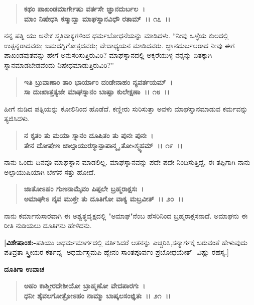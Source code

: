 \begin{verse}
\textbf{ಕಥಂ ಪಾಖಂಡಮಾರ್ಗೇಷು ವರ್ತಸೇ ಜ್ಞಾನದುರ್ಬಲ~।}\\\textbf{ಮಾಂ ನಿಷೇಧಸಿ ಕಸ್ಮಾದ್ವಾ ಮಾಘಸ್ನಾನವಿಧೌ ರತಾಮ್~।। ೧೭~।।}
\end{verse}

ನನ್ನ ಪತ್ನಿ ಯು ಅನೇಕ ಸ್ಮತಿವಾಕ್ಯಗಳಿಂದ ಧರ್ಮಬೋಧನೆಯನ್ನು ಮಾಡಿದಳು. “ನೀವು ಒಳ್ಳೆಯ ಕುಲದಲ್ಲಿ ಉತ್ಪನ್ನರಾದವರು; ಜಮದಗ್ನಿಗೋತ್ರದವರು; ವೇದಾಧ್ಯಯನ ಮಾಡಿದವರು. ಜ್ಞಾನದುರ್ಬಲರಾದ ನೀವು ಈಗ ಪಾಖಂಡವುತವನ್ನು ಹೇಗೆ ಅನುಸರಿಸುತ್ತಿರುವಿರಿ? ಮಾಘಸ್ನಾನದಲ್ಲಿ ಅಕ್ಕರೆಯುಳ್ಳ ನನ್ನನ್ನು ಏತಕ್ಕಾಗಿ ಸ್ನಾನಮಾಡಬೇಡವೆಂದು ನಿಷೇಧಮಾಡುತ್ತಿರುವಿರಿ?”

\begin{verse}
\textbf{ಇತಿ ಬ್ರುವಾಣಾಂ ತಾಂ ಭಾರ್ಯಾಂ ದಂಡೇನಾಹಂ ನ್ಯವರ್ತಯಮ್~।}\\\textbf{ಸಾ ದುಃಖಾತ್ತತ್ಯಜೇ ಮಾಘಸ್ನಾನಂ ಬಾಷ್ಪಾ ಕುಲೇಕ್ಷಣಾ~।। ೧೮~।।}
\end{verse}

ಹೀಗೆ ನುಡಿದ ಪತ್ನಿಯನ್ನು ಕೋಲಿನಿಂದ ಹೊಡೆದೆ. ಕಣ್ಣೀರು ಸುರಿಸುತ್ತಾ ಅವಳು ಮಾಘಸ್ನಾನಮಾಡುವ ಕರ್ಮವನ್ನು ತ್ಯಜಿಸಿದಳು.

\begin{verse}
\textbf{ನ ಕೃತಂ ತು ಮಯಾ ಸ್ನಾನಂ ದೂಷಿತಂ ತು ಪುನಃ ಪುನಃ~।}\\\textbf{ತೇನ ದೋಷೇಣ ಚಾಲ್ಪಾಯುರಸ್ಮಾನ್ಪಾಪಾನ್ಮೃ ತೋsಸ್ಮ್ಯಹಮ್~।। ೧೯~।।}
\end{verse}

ನಾನು ಒಂದು ದಿನವೂ ಮಾಘಸ್ನಾನ ಮಾಡಲಿಲ್ಲ. ಮಾಘಸ್ನಾನವನ್ನು ಪದೇ ಪದೇ ನಿಂದಿಸುತ್ತಿದ್ದೆ, ಈ ತಪ್ಪಿಗಾಗಿ ನಾನು ಅಲ್ಪಾಯುಷಿಯಾಗಿ ಬೇಗನೆ ಸತ್ತು ಹೋದೆ.

\begin{verse}
\textbf{ಜಾತೋಽಹಂ ಗುಣನಾಮೈವಂ ಪಿಪ್ಪಲೇ ಬ್ರಹ್ಮರಾಕ್ಷಸಃ~।}\\\textbf{ಅಮಾಘೇಽ ನೈವ ಮುಕ್ತೇ ತು ದೂತಿಗೋ ವಾಕ್ಯ ಮಬ್ರವೀತ್~।। ೨೦~।।}
\end{verse}

ನಾನು ಕರ್ಮಾನುಸಾರವಾಗಿ ಈ ಅಶ್ವತ್ಥವೃಕ್ಷದಲ್ಲಿ "ಅಮಾಘ"ನೆಂಬ ಹೆಸರಿನಿಂದ ಬ್ರಹ್ಮರಾಕ್ಷಸನಾದೆ. ಅಮಾಘನು ಈ ರೀತಿ ನುಡಿಯಲು ದೂತಿಗನು ಹೇಳಿದನು.

\textbf{[ವಿಶೇಷಾಂಶ:-}ಪತಿಯು ಅಧರ್ಮಮಾರ್ಗದಲ್ಲಿ ವರ್ತಿಸಿದರೆ ಆತನನ್ನು ಎಚ್ಚರಿಸಿ,\break ಸನ್ಮಾರ್ಗಕ್ಕೆ ಬರುವಂತೆ ಹೇಳುವುದು ಪತಿವ್ರತಾ ಸ್ತ್ರೀಯರ ಕರ್ತವ್ಯ- ಅಧರ್ಮಸ್ಥಮಪಿ ಹ್ಯೇನಂ ಸಾಂತಪೂರ್ವಂ ಪ್ರಬೋಧಯೇತ್- ವಿಷ್ಣು ರಹಸ್ಯ.]

\begin{flushleft}
\textbf{ದೂತಿಗಾ ಉವಾಚ\enginline{-}}
\end{flushleft}

\begin{verse}
\textbf{ಅಹಂ ಕಾಶ್ಮೀರದೇಶೀಯೋ ಬ್ರಾಹ್ಮಣೋ ವೇದಪಾರಗಃ~।}\\\textbf{ಧನೀ ಶೈವಲಗೋತ್ರೋಽಹಂ ನಾಮ್ಮಾ ಬಾಷ್ಕಲಸಂಜ್ಞಿತಃ~।। ೨೧~।। }
\end{verse}

